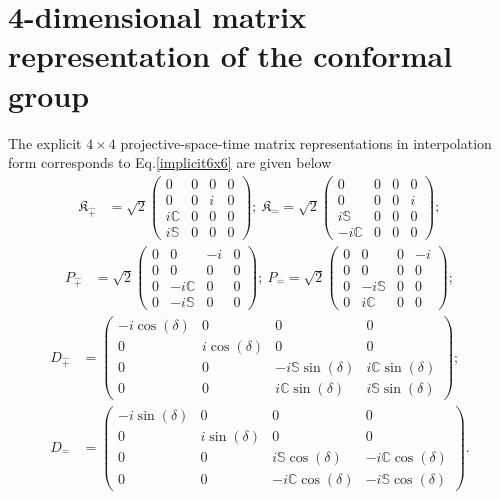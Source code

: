 \documentclass[%
 reprint,
superscriptaddress,
 amsmath,amssymb,
 aps,
]{revtex4-2}
\begin{document}
\section{4-dimensional matrix representation of the conformal group} 
\label{4x4}
The explicit $4\times4$ projective-space-time matrix representations in interpolation form corresponds to Eq.\eqref{implicit6x6} are given below
\begin{align}
    \mathfrak{K}_{\hat{+}}&=\sqrt{2}\begin{pmatrix}
        0&0&0&0\\
        0&0&i&0\\
        i\mathbb{C}&0&0&0\\
        i\mathbb{S}&0&0&0
    \end{pmatrix};~\mathfrak{K}_{\hat{-}}=\sqrt{2}\begin{pmatrix}
        0&0&0&0\\
        0&0&0&i\\
        i\mathbb{S}&0&0&0\\
        -i\mathbb{C}&0&0&0
    \end{pmatrix};\nonumber
    \end{align}
    \begin{align}
     P_{\hat{+}}&=\sqrt{2}\begin{pmatrix}
        0&0&-i&0\\
        0&0&0&0\\
        0&-i\mathbb{C}&0&0\\
        0&-i\mathbb{S}&0&0
    \end{pmatrix};~P_{\hat{-}}=\sqrt{2}\begin{pmatrix}
        0&0&0&-i\\
        0&0&0&0\\
        0&-i\mathbb{S}&0&0\\
        0&i\mathbb{C}&0&0
    \end{pmatrix};\nonumber
    \end{align}
\begin{align}
    D_{\hat{+}}&=\begin{pmatrix}
        -i\cos{(\delta)}&0&0&0\\
        0&i\cos{(\delta)}&0&0\\
        0&0&-i\mathbb{S}\sin{(\delta)}&i\mathbb{C}\sin{(\delta)}\\
        0&0&i\mathbb{C}\sin{(\delta)}&i\mathbb{S}\sin{(\delta)}
    \end{pmatrix};\nonumber\\
    D_{\hat{-}}&=\begin{pmatrix}
        -i\sin{(\delta)}&0&0&0\\
        0&i\sin{(\delta)}&0&0\\
        0&0&i\mathbb{S}\cos{(\delta)}&-i\mathbb{C}\cos{(\delta)}\\
        0&0&-i\mathbb{C}\cos{(\delta)}&-i\mathbb{S}\cos{(\delta)}
    \end{pmatrix}.\\
    \nonumber
\end{align}
\end{document}
